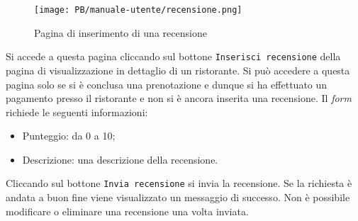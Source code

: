 \begin{figure}[htbp]
    \centering
	\texttt{[image: PB/manuale-utente/recensione.png]}
    \caption{Pagina di inserimento di una recensione}
\end{figure}

Si accede a questa pagina cliccando sul bottone \texttt{Inserisci recensione} della
pagina di visualizzazione in dettaglio di un ristorante. Si può accedere a
questa pagina solo se si è conclusa una prenotazione e dunque si ha effettuato un pagamento presso il ristorante e non
si è ancora inserita una recensione. Il \textit{form} richiede le seguenti
informazioni:
\begin{itemize}
	\item Punteggio: da 0 a 10;
	\item Descrizione: una descrizione della recensione.
\end{itemize}

Cliccando sul bottone \texttt{Invia recensione} si invia la recensione. Se la
richiesta è andata a buon fine viene visualizzato un messaggio di successo. Non
è possibile modificare o eliminare una recensione una volta inviata.
